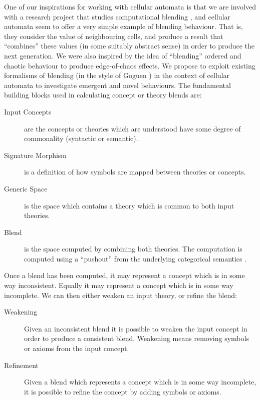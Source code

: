 \documentclass{AISB2008}
\begin{document}
One of our inspirations for working with cellular automata is that we
are involved with a research project that studies computational
blending \cite{schorlemmer2014coinvent}, and cellular automata seem to
offer a very simple example of blending behaviour.  That is, they
consider the value of neighbouring cells, and produce a result that
``combines'' these values (in some suitably abstract sense) in order
to produce the next generation.  We were also inspired by the idea of
``blending'' ordered and chaotic behaviour to produce edge-of-chaos
effects.
%
We propose to exploit existing formalisms of blending (in the style of
Goguen \cite{gog05}) in the context of cellular automata to
investigate emergent and novel behaviours.  The fundamental building
blocks used in calculating concept or theory blends are:
\begin{description}
\item[Input Concepts] are the concepts or theories which are understood have some degree of commonality (syntactic or semantic). 
\item[Signature Morphism] is a definition of how symbols are mapped between theories or concepts. 
\item[Generic Space] is the space which contains a theory which is common to both input theories.
\item[Blend] is the space computed by combining both theories. The computation is computed using a ``pushout'' from the underlying categorical semantics \cite{MossakowskiEA06}. 
\end{description}

Once a blend has been computed, it may represent a concept which is in
some way inconsistent. Equally it may represent a concept which is in
some way incomplete. We can then either weaken an input theory, or
refine the blend:
\begin{description}
\item[Weakening] Given an inconsistent blend it is possible to weaken the input concept in order to produce a consistent blend. Weakening means removing symbols or axioms from the input concept.
\item[Refinement] Given a blend which represents a concept which is in some way incomplete, it is possible to refine the concept by adding symbols or axioms.
\end{description}
\end{document}
